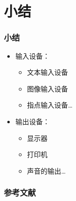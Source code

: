 \documentclass{beamer}
\begin{document}
\section{小结}
\begin{frame}
	\frametitle{小结}
	\begin{itemize}
		\item 输入设备：
		\begin{itemize}
			\item 文本输入设备
			\item 图像输入设备
			\item 指点输入设备\dots
		\end{itemize}
		\item 输出设备：
		\begin{itemize}
			\item 显示器 
			\item 打印机
			\item 声音的输出\dots
		\end{itemize}
	\end{itemize}
\end{frame}
 
\begin{frame}
	\frametitle{参考文献}
	
	
\end{frame}
\end{document}
